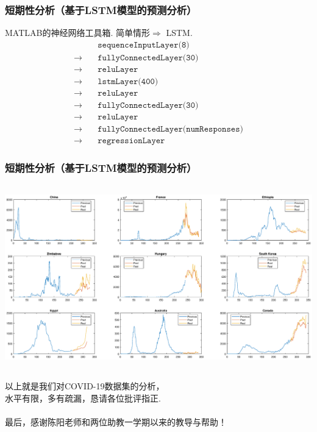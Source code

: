 \documentclass{beamer}
\begin{document}
\begin{frame}
\frametitle{短期性分析（基于LSTM模型的预测分析）}
    MATLAB的神经网络工具箱. 简单情形$\Rightarrow$ LSTM. 
    \begin{align*}
		&\texttt{sequenceInputLayer(8)} \\
        \rightarrow\quad&\texttt{fullyConnectedLayer(30)}\\
    	\rightarrow\quad&\texttt{reluLayer}\\
    	\rightarrow\quad&\texttt{lstmLayer(400)}\\
    	\rightarrow\quad&\texttt{reluLayer}\\
    	\rightarrow\quad&\texttt{fullyConnectedLayer(30)}\\
    	\rightarrow\quad&\texttt{reluLayer}\\
    	\rightarrow\quad&\texttt{fullyConnectedLayer(numResponses)}\\
    	\rightarrow\quad&\texttt{regressionLayer}
	\end{align*}
\end{frame}
\begin{frame}
\frametitle{短期性分析（基于LSTM模型的预测分析）}
    \begin{adjustwidth}{-1.5cm}{}
        \includegraphics[height=8cm, width=14cm]{./images/Chapter5/Pred.eps}
    \end{adjustwidth}
\end{frame}
\begin{frame}
    \begin{center}
    以上就是我们对COVID-19数据集的分析，\\
    水平有限，多有疏漏，恳请各位批评指正. \\
    \quad\\
    最后，感谢陈阳老师和两位助教一学期以来的教导与帮助！
    \end{center}
\end{frame}
\end{document}
